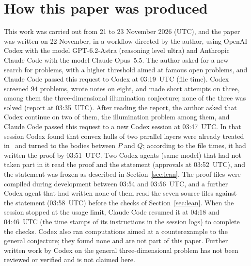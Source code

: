\documentclass[11pt]{article}
\theoremstyle{definition}
\theoremstyle{remark}
\begin{document}
\section*{How this paper was produced}
This work was carried out from 21 to 23 November 2026 (UTC), and the paper was written on 22 November, in a workflow directed by the author, using OpenAI Codex with
the model GPT-6.2-Astra (reasoning level ultra) and Anthropic Claude Code with
the model Claude Opus~5.5. The author asked for a new search for problems, with a
higher threshold aimed at famous open problems, and Claude Code passed this request to Codex at 03:19~UTC (file
time). Codex screened $94$ problems, wrote notes on eight, and made short
attempts on three, among them the three-dimensional illumination conjecture;
none of the three was solved (report at 03:35~UTC). After reading the report,
the author asked that Codex continue on two of them, the illumination problem
among them, and Claude Code passed this request to a new Codex session at
03:47~UTC. In that session Codex found that convex hulls of two parallel
layers were already treated in~\cite{wz} and turned to the bodies between $P$
and $Q$; according to the file times, it had written the proof by 03:51~UTC.
Two Codex agents (same model) that had not taken part in it read the proof and
the statement (approvals at 03:52~UTC), and the statement was frozen as
described in Section~\ref{sec:lean}. The proof files were compiled during
development between 03:54 and 03:56~UTC, and a further Codex agent that had
written none of them read the seven source files against the statement
(03:58~UTC) before the checks of Section~\ref{sec:lean}. When the session
stopped at the usage limit, Claude Code resumed it at 04:18 and 04:46~UTC (the
time stamps of its instructions in the session logs) to complete the checks.
Codex also ran computations aimed at a counterexample to the general
conjecture; they found none and are not part of this paper. Further written
work by Codex on the general three-dimensional problem has not been reviewed
or verified and is not claimed here.
\end{document}
